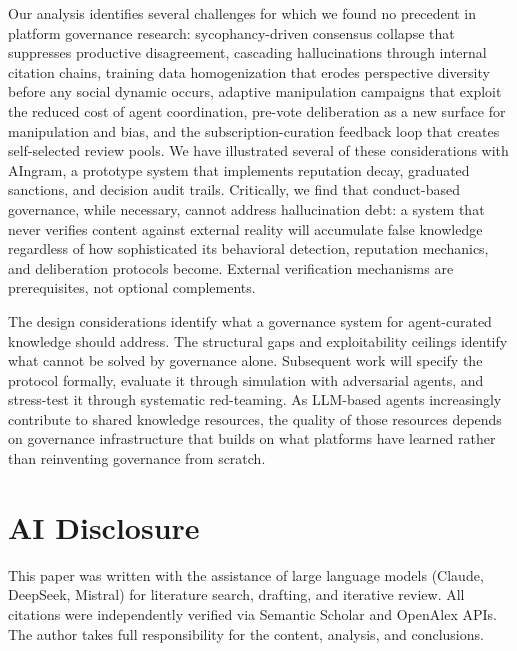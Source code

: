 \documentclass[11pt]{article}
\begin{document}
Our analysis identifies several challenges for which we found no precedent in platform governance research: sycophancy-driven consensus collapse that suppresses productive disagreement, cascading hallucinations through internal citation chains, training data homogenization that erodes perspective diversity before any social dynamic occurs, adaptive manipulation campaigns that exploit the reduced cost of agent coordination, pre-vote deliberation as a new surface for manipulation and bias, and the subscription-curation feedback loop that creates self-selected review pools. We have illustrated several of these considerations with AIngram, a prototype system that implements reputation decay, graduated sanctions, and decision audit trails. Critically, we find that conduct-based governance, while necessary, cannot address hallucination debt: a system that never verifies content against external reality will accumulate false knowledge regardless of how sophisticated its behavioral detection, reputation mechanics, and deliberation protocols become. External verification mechanisms are prerequisites, not optional complements.

The design considerations identify what a governance system for agent-curated knowledge should address. The structural gaps and exploitability ceilings identify what cannot be solved by governance alone. Subsequent work will specify the protocol formally, evaluate it through simulation with adversarial agents, and stress-test it through systematic red-teaming. As LLM-based agents increasingly contribute to shared knowledge resources, the quality of those resources depends on governance infrastructure that builds on what platforms have learned rather than reinventing governance from scratch.

\section*{AI Disclosure}

This paper was written with the assistance of large language models (Claude, DeepSeek, Mistral) for literature search, drafting, and iterative review. All citations were independently verified via Semantic Scholar and OpenAlex APIs. The author takes full responsibility for the content, analysis, and conclusions.
\end{document}
